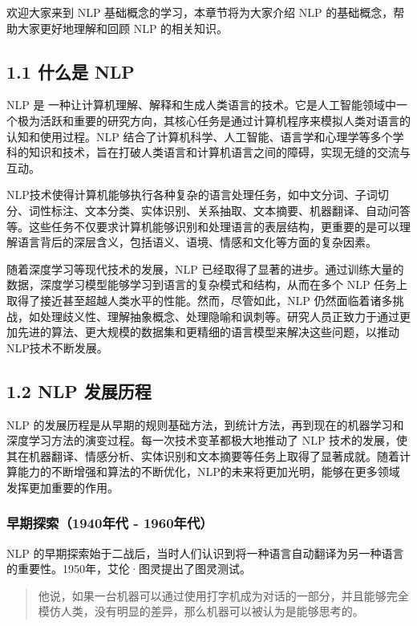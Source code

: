 \documentclass[12pt,a4paper]{book}
\begin{document}
欢迎大家来到 NLP 基础概念的学习，本章节将为大家介绍 NLP
的基础概念，帮助大家更好地理解和回顾 NLP 的相关知识。

\subsection{1.1 什么是 NLP}\label{ux4ec0ux4e48ux662f-nlp}

NLP 是
一种让计算机理解、解释和生成人类语言的技术。它是人工智能领域中一个极为活跃和重要的研究方向，其核心任务是通过计算机程序来模拟人类对语言的认知和使用过程。NLP
结合了计算机科学、人工智能、语言学和心理学等多个学科的知识和技术，旨在打破人类语言和计算机语言之间的障碍，实现无缝的交流与互动。

NLP技术使得计算机能够执行各种复杂的语言处理任务，如中文分词、子词切分、词性标注、文本分类、实体识别、关系抽取、文本摘要、机器翻译、自动问答等。这些任务不仅要求计算机能够识别和处理语言的表层结构，更重要的是可以理解语言背后的深层含义，包括语义、语境、情感和文化等方面的复杂因素。

随着深度学习等现代技术的发展，NLP
已经取得了显著的进步。通过训练大量的数据，深度学习模型能够学习到语言的复杂模式和结构，从而在多个
NLP 任务上取得了接近甚至超越人类水平的性能。然而，尽管如此，NLP
仍然面临着诸多挑战，如处理歧义性、理解抽象概念、处理隐喻和讽刺等。研究人员正致力于通过更加先进的算法、更大规模的数据集和更精细的语言模型来解决这些问题，以推动NLP技术不断发展。

\subsection{1.2 NLP 发展历程}\label{nlp-ux53d1ux5c55ux5386ux7a0b}

NLP
的发展历程是从早期的规则基础方法，到统计方法，再到现在的机器学习和深度学习方法的演变过程。每一次技术变革都极大地推动了
NLP
技术的发展，使其在机器翻译、情感分析、实体识别和文本摘要等任务上取得了显著成就。随着计算能力的不断增强和算法的不断优化，NLP的未来将更加光明，能够在更多领域发挥更加重要的作用。

\subsubsection{早期探索（1940年代 -
1960年代）}\label{ux65e9ux671fux63a2ux7d221940ux5e74ux4ee3---1960ux5e74ux4ee3}

NLP
的早期探索始于二战后，当时人们认识到将一种语言自动翻译为另一种语言的重要性。1950年，艾伦·图灵提出了图灵测试。

\begin{quote}
他说，如果一台机器可以通过使用打字机成为对话的一部分，并且能够完全模仿人类，没有明显的差异，那么机器可以被认为是能够思考的。
\end{quote}
\end{document}
